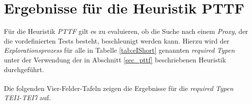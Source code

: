 \section{Ergebnisse für die Heuristik PTTF}\label{sec_evalPTTF}
Für die \Gls{Heuristik} \emph{PTTF} gilt es zu evaluieren, ob die Suche nach einem \emph{Proxy}, der die vordefinierten Tests besteht, beschleunigt werden kann. Hierzu wird der \emph{Explorationsprozess} für alle in Tabelle \ref{tab:eIShort} genannten \emph{required Typen} unter der Verwendung der in Abschnitt \ref{sec_pttf} beschriebenen \Gls{Heuristik} durchgeführt.
\\\\
Die folgenden Vier-Felder-Tafeln zeigen die Ergebnisse für die \emph{required Typen} \emph{TEI1}-\emph{TEI7} auf.
\begin{multicols}{3}
\end{multicols}

\begin{multicols}{2}
\end{multicols}
\pagebreak
\begin{multicols}{2}
\end{multicols}

\begin{multicols}{2}
\end{multicols}

